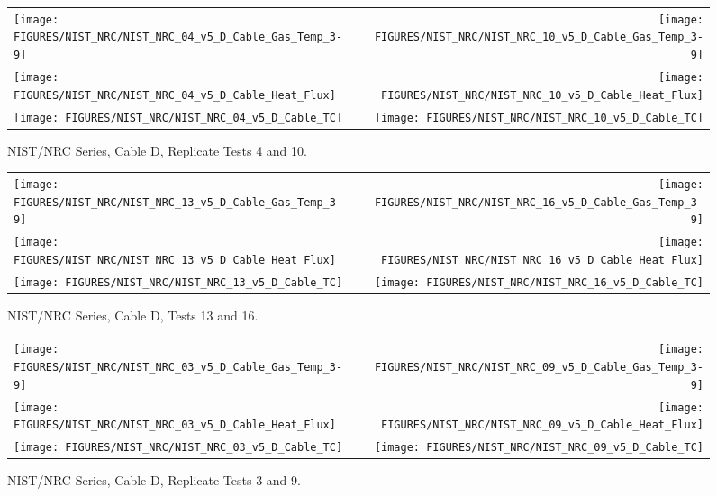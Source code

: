 \begin{figure}[h]
\begin{tabular*}{\textwidth}{l@{\extracolsep{\fill}}r}
\texttt{[image: FIGURES/NIST\_NRC/NIST\_NRC\_04\_v5\_D\_Cable\_Gas\_Temp\_3-9]} &
\texttt{[image: FIGURES/NIST\_NRC/NIST\_NRC\_10\_v5\_D\_Cable\_Gas\_Temp\_3-9]} \\
\texttt{[image: FIGURES/NIST\_NRC/NIST\_NRC\_04\_v5\_D\_Cable\_Heat\_Flux]} &
\texttt{[image: FIGURES/NIST\_NRC/NIST\_NRC\_10\_v5\_D\_Cable\_Heat\_Flux]} \\
\texttt{[image: FIGURES/NIST\_NRC/NIST\_NRC\_04\_v5\_D\_Cable\_TC]} &
\texttt{[image: FIGURES/NIST\_NRC/NIST\_NRC\_10\_v5\_D\_Cable\_TC]}
\end{tabular*}
\caption{NIST/NRC Series, Cable D, Replicate Tests 4 and 10.}
\label{NIST_NRC_D_4_and_10}
\end{figure}

\begin{figure}[h]
\begin{tabular*}{\textwidth}{l@{\extracolsep{\fill}}r}
\texttt{[image: FIGURES/NIST\_NRC/NIST\_NRC\_13\_v5\_D\_Cable\_Gas\_Temp\_3-9]} &
\texttt{[image: FIGURES/NIST\_NRC/NIST\_NRC\_16\_v5\_D\_Cable\_Gas\_Temp\_3-9]} \\
\texttt{[image: FIGURES/NIST\_NRC/NIST\_NRC\_13\_v5\_D\_Cable\_Heat\_Flux]} &
\texttt{[image: FIGURES/NIST\_NRC/NIST\_NRC\_16\_v5\_D\_Cable\_Heat\_Flux]} \\
\texttt{[image: FIGURES/NIST\_NRC/NIST\_NRC\_13\_v5\_D\_Cable\_TC]} &
\texttt{[image: FIGURES/NIST\_NRC/NIST\_NRC\_16\_v5\_D\_Cable\_TC]}
\end{tabular*}
\caption{NIST/NRC Series, Cable D, Tests 13 and 16.}
\label{NIST_NRC_D_13_and_16}
\end{figure}

\begin{figure}[h]
\begin{tabular*}{\textwidth}{l@{\extracolsep{\fill}}r}
\texttt{[image: FIGURES/NIST\_NRC/NIST\_NRC\_03\_v5\_D\_Cable\_Gas\_Temp\_3-9]} &
\texttt{[image: FIGURES/NIST\_NRC/NIST\_NRC\_09\_v5\_D\_Cable\_Gas\_Temp\_3-9]} \\
\texttt{[image: FIGURES/NIST\_NRC/NIST\_NRC\_03\_v5\_D\_Cable\_Heat\_Flux]} &
\texttt{[image: FIGURES/NIST\_NRC/NIST\_NRC\_09\_v5\_D\_Cable\_Heat\_Flux]} \\
\texttt{[image: FIGURES/NIST\_NRC/NIST\_NRC\_03\_v5\_D\_Cable\_TC]} &
\texttt{[image: FIGURES/NIST\_NRC/NIST\_NRC\_09\_v5\_D\_Cable\_TC]}
\end{tabular*}
\caption{NIST/NRC Series, Cable D, Replicate Tests 3 and 9.}
\label{NIST_NRC_D_3_and_9}
\end{figure}

